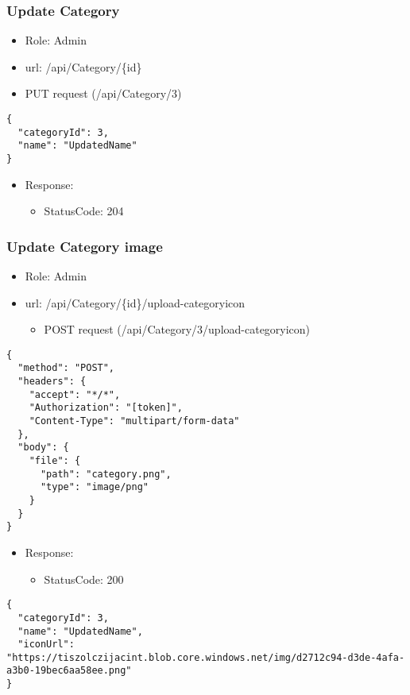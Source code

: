\documentclass[11pt]{article}
\begin{document}
\subsubsection{Update Category}
\label{sec:orgeff043f}
\begin{itemize}
\item Role: Admin
\item url: /api/Category/\{id\}
\item PUT request (/api/Category/3)
\end{itemize}
\begin{verbatim}
{
  "categoryId": 3,
  "name": "UpdatedName"
}
\end{verbatim}
\begin{itemize}
\item Response:
\begin{itemize}
\item StatusCode: 204
\end{itemize}
\end{itemize}
\subsubsection{Update Category image}
\label{sec:org3fb80aa}
\begin{itemize}
\item Role: Admin
\item url: /api/Category/\{id\}/upload-categoryicon
\begin{itemize}
\item POST request (/api/Category/3/upload-categoryicon)
\end{itemize}
\end{itemize}
\begin{verbatim}
{
  "method": "POST",
  "headers": {
    "accept": "*/*",
    "Authorization": "[token]",
    "Content-Type": "multipart/form-data"
  },
  "body": {
    "file": {
      "path": "category.png",
      "type": "image/png"
    }
  }
}

\end{verbatim}
\begin{itemize}
\item Response:
\begin{itemize}
\item StatusCode: 200
\end{itemize}
\end{itemize}
\begin{verbatim}
{
  "categoryId": 3,
  "name": "UpdatedName",
  "iconUrl": "https://tiszolczijacint.blob.core.windows.net/img/d2712c94-d3de-4afa-a3b0-19bec6aa58ee.png"
}
\end{verbatim}
\end{document}
